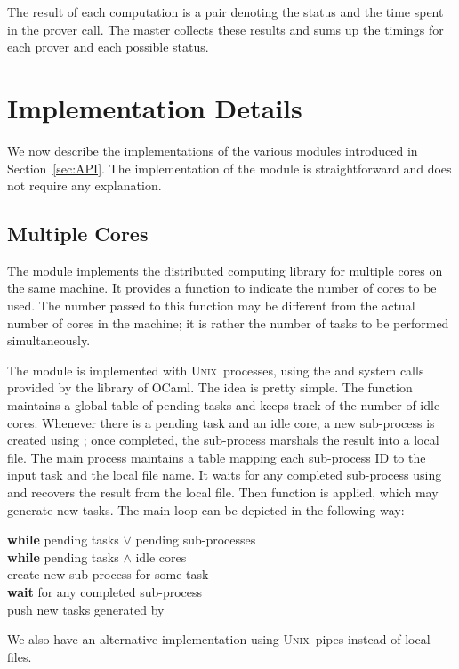 \documentclass[a4paper,12pt]{article}
\newcommand{\Ocaml}{OCaml}
\newcommand{\unix}{\textsc{Unix}}
\begin{document}
The result of each computation is a pair denoting the status and the
time spent in the prover call. The master collects these results and
sums up the timings for each prover and each possible status.

\section{Implementation Details}\label{sec:implem}

We now describe the implementations of the various modules introduced
in Section~\ref{sec:API}. The implementation of the 
module is straightforward and does not require any explanation.

\subsection{Multiple Cores}

The  module implements the distributed computing library for
multiple cores on the same machine. 
It provides a function
 to indicate the number of cores
to be used. The number passed to this function may be different from
the actual number of cores in the machine; it is rather the number of
tasks to be performed simultaneously.

The  module is implemented with \unix\ processes, using the
 and  system calls provided by the  library
of \Ocaml. The idea is pretty simple.  The  function
maintains a global table of pending tasks and keeps track of the
number of idle cores.  Whenever there is a pending task and an idle
core, a new sub-process is created using ; once
completed, the sub-process marshals the result into a 
local file. The
main process maintains a table mapping each sub-process ID to the
input task and the local file name. It waits for any completed
sub-process using  and recovers the result from the
local file. Then function  is applied, which may generate
new tasks.  The main loop can be depicted in the following way:
\begin{flushleft}
  \quad  \textbf{while} pending tasks $\lor$ pending sub-processes \\
  \quad  \quad \textbf{while} pending tasks $\land$ idle cores \\
  \quad  \quad \quad create new sub-process for some task \\
  \quad  \quad \textbf{wait} for any completed sub-process \\
  \quad  \quad \quad push new tasks generated by  \\
\end{flushleft}
We also have an alternative implementation using
\unix\ pipes instead of local files.
\end{document}
